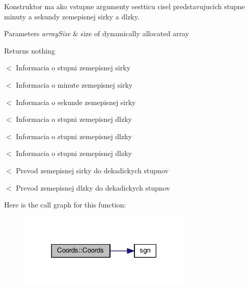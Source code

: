 Konstruktor ma ako vstupne argumenty sestticu cisel predstavujucich stupne minuty a sekundy zemepisnej sirky a dlzky.


\begin{DoxyParams}{Parameters}
{\em array\-Size} & size of dynamically allocated array \\
\hline
\end{DoxyParams}
\begin{DoxyReturn}{Returns}
nothing 
\end{DoxyReturn}
$<$ Informacia o stupni zemepisnej sirky

$<$ Informacia o minute zemepisnej sirky

$<$ Informacia o sekunde zemepisnej sirky

$<$ Informacia o stupni zemepisnej dlzky

$<$ Informacia o stupni zemepisnej dlzky

$<$ Informacia o stupni zemepisnej dlzky

$<$ Prevod zemepisnej sirky do dekadickych stupnov

$<$ Prevod zemepisnej dlzky do dekadickych stupnov 

Here is the call graph for this function\-:
\nopagebreak
\begin{figure}[H]
\begin{center}
\leavevmode
\includegraphics[width=234pt]{classCoords_a370c5fad753558f68cfe993ccfa6aefc_cgraph}
\end{center}
\end{figure}




